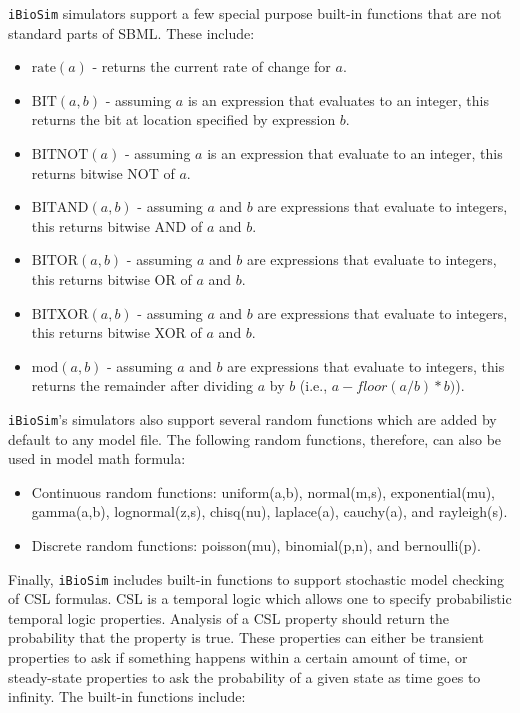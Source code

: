 \documentclass[titlepage,11pt]{article}
\begin{document}
{\tt iBioSim} simulators support a few special purpose built-in functions that are not standard parts of SBML.  These include:
\begin{itemize}
\item $\mbox{rate}(a)$ - returns the current rate of change for $a$.
\item $\mbox{BIT}(a,b)$ - assuming $a$ is an expression that evaluates to an integer, this returns the bit at location specified by expression $b$.
\item $\mbox{BITNOT}(a)$ - assuming $a$ is an expression that evaluate to an integer, this returns bitwise NOT of $a$.
\item $\mbox{BITAND}(a,b)$ - assuming $a$ and $b$ are expressions that evaluate to integers, this returns bitwise AND of $a$ and $b$.
\item $\mbox{BITOR}(a,b)$ - assuming $a$ and $b$ are expressions that evaluate to integers, this returns bitwise OR of $a$ and $b$.
\item $\mbox{BITXOR}(a,b)$ - assuming $a$ and $b$ are expressions that evaluate to integers, this returns bitwise XOR of $a$ and $b$.
\item $\mbox{mod}(a,b)$ - assuming $a$ and $b$ are expressions that evaluate to integers, this returns the remainder after dividing $a$ by $b$ (i.e., $a-floor(a/b)*b)$).
\end{itemize}
{\tt iBioSim}'s simulators also support several random functions which are added by default to any model file.  The following random functions, therefore, can also be used in model math formula:
\begin{itemize}
\item Continuous random functions: uniform(a,b), normal(m,s), exponential(mu), gamma(a,b), lognormal(z,s), chisq(nu), laplace(a), cauchy(a), and rayleigh(s).
\item Discrete random functions: poisson(mu), binomial(p,n), and bernoulli(p).
\end{itemize}
Finally, {\tt iBioSim} includes built-in functions to support stochastic model checking of CSL formulas.  CSL is a temporal logic which allows one to specify probabilistic temporal logic properties.  Analysis of a CSL property should return the probability that the property is true.  These properties can either be transient properties to ask if something happens within a certain amount of time, or steady-state properties to ask the probability of a given state as time goes to infinity.  The built-in functions include:
\end{document}
